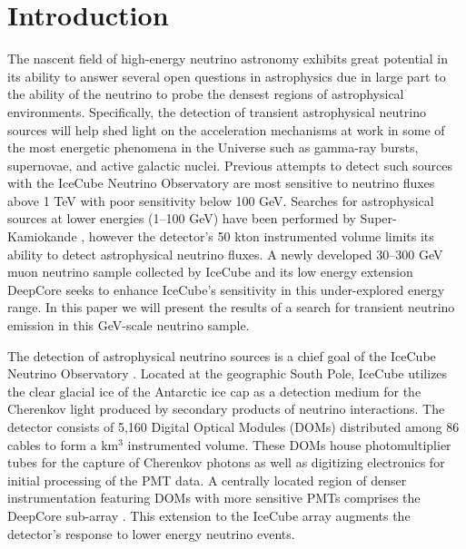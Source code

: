 \documentclass[manuscript]{aastex}
\begin{document}
\section{Introduction}
The nascent field of high-energy neutrino astronomy exhibits great potential in its ability to answer several open questions in astrophysics due in large part to the ability of the neutrino to probe the densest regions of astrophysical environments. Specifically, the detection of transient astrophysical neutrino sources will help shed light on the acceleration mechanisms at work in some of the most energetic phenomena in the Universe such as gamma-ray bursts, supernovae, and active galactic nuclei. Previous attempts to detect such sources with the IceCube Neutrino Observatory \citep{2006APh....26..155I} are most sensitive to neutrino fluxes above 1 TeV with poor sensitivity below 100 GeV. Searches for astrophysical sources at lower energies (1--100 GeV) have been performed by Super-Kamiokande \citep{2009ApJ...704..503T}, however the detector's 50 kton instrumented volume limits its ability to detect astrophysical neutrino fluxes. A newly developed 30--300 GeV muon neutrino sample collected by IceCube and its low energy extension DeepCore \citep{2012APh....35..615A} seeks to enhance IceCube's sensitivity in this under-explored energy range. In this paper we will present the results of a search for transient neutrino emission in this GeV-scale neutrino sample.

The detection of astrophysical neutrino sources is a chief goal of the IceCube Neutrino Observatory \citep{2006APh....26..155I}. Located at the geographic South Pole, IceCube utilizes the clear glacial ice of the Antarctic ice cap as a detection medium for the Cherenkov light produced by secondary products of neutrino interactions. The detector consists of 5,160 Digital Optical Modules (DOMs) distributed among 86 cables to form a km$^3$ instrumented volume. These DOMs house photomultiplier tubes for the capture of Cherenkov photons as well as digitizing electronics for initial processing of the PMT data. A centrally located region of denser instrumentation featuring DOMs with more sensitive PMTs comprises the DeepCore sub-array \citep{2012APh....35..615A}. This extension to the IceCube array augments the detector's response to lower energy neutrino events.
\end{document}
